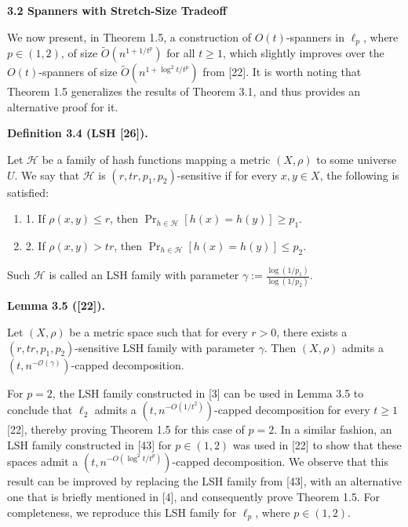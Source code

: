 \documentclass[10pt,a4paper]{amsart}
\begin{document}
\par
\par
\par
\par
\par\medskip\noindent\textbf{3.2 Spanners with Stretch-Size Tradeoff}\par
We now present, in Theorem 1.5, a construction of $O(t)$-spanners in $\ell_{p}$, where $p\in(1,2)$, of size $\tilde{O}(n^{1+1/t^{p}})$ for all $t\geq 1$, which slightly improves over the $O(t)$-spanners of size $\tilde{O}(n^{1+\log^{2}{t}/t^{p}})$ from [22]. It is worth noting that Theorem 1.5 generalizes the results of Theorem 3.1, and thus provides an alternative proof for it.
\par
\par
\par\medskip\noindent\textbf{Definition 3.4 (LSH [26]).}\par
Let $\mathcal{H}$ be a family of hash functions mapping a metric $(X,\rho)$ to some universe $U$. We say that $\mathcal{H}$ is $(r,tr,p_{1},p_{2})$-sensitive if for every $x,y\in X$, the following is satisfied:
\par
\begin{enumerate}
\item  1. 
If $\rho(x,y)\leq r$, then $\Pr_{h\in\mathcal{H}}[h(x)=h(y)]\geq p_{1}$.
\par
\par
\item  2. 
If $\rho(x,y)>tr$, then $\Pr_{h\in\mathcal{H}}[h(x)=h(y)]\leq p_{2}$.
\par
\par
\end{enumerate}
Such $\mathcal{H}$ is called an LSH family with parameter $\gamma:=\frac{\log(1/p_{1})}{\log(1/p_{2})}$.
\par
\par
\par
\par\medskip\noindent\textbf{Lemma 3.5 ([22]).}\par
Let $(X,\rho)$ be a metric space such that for every $r>0$, there exists a $(r,tr,p_{1},p_{2})$-sensitive LSH family with parameter $\gamma$. Then $(X,\rho)$ admits a $(t,n^{-\mathcal{O}(\gamma)})$-capped decomposition.
\par
\par
\par
For $p=2$, the LSH family constructed in [3] can be used in Lemma 3.5 to conclude that $\ell_{2}$ admits a $(t,n^{-O(1/t^{2})})$-capped decomposition for every $t\geq 1$ [22], thereby proving Theorem 1.5 for this case of $p=2$. In a similar fashion, an LSH family constructed in [43] for $p\in(1,2)$ was used in [22] to show that these spaces admit a $(t,n^{-O(\log^{2}{t}/t^{p})})$-capped decomposition. We observe that this result can be improved by replacing the LSH family from [43], with an alternative one that is briefly mentioned in [4], and consequently prove Theorem 1.5. For completeness, we reproduce this LSH family for $\ell_{p}$, where $p\in(1,2)$.
\end{document}
